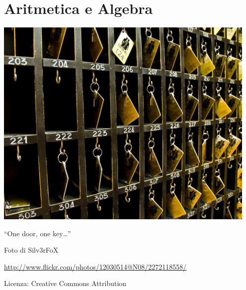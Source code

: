 
\part{Aritmetica e Algebra}

\includegraphics[width=0.95\textwidth]{img/onedoor.jpg}
  \begin{center}
    {\large ``One door, one key\ldots''}\par
    Foto di Silv3rFoX\par
    \url{http://www.flickr.com/photos/12030514@N08/2272118558/}\par
    Licenza: Creative Commons Attribution\par
  \end{center}
\clearpage
\cleardoublepage